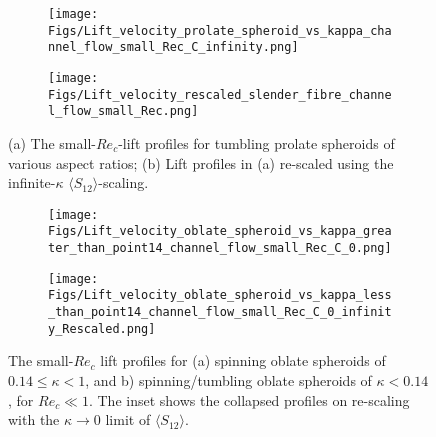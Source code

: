 \documentclass{jfm}
\begin{document}
\begin{figure}
	\centering
    \begin{subfigure}[b]{0.49\textwidth}
		\texttt{[image: Figs/Lift\_velocity\_prolate\_spheroid\_vs\_kappa\_channel\_flow\_small\_Rec\_C\_infinity.png]}
        \caption{}
    \end{subfigure}
    \hfill
    \begin{subfigure}[b]{0.49\textwidth}
		\texttt{[image: Figs/Lift\_velocity\_rescaled\_slender\_fibre\_channel\_flow\_small\_Rec.png]}
        \caption{}
    \end{subfigure}
	\caption{(a) The small-$Re_c$-lift profiles for tumbling prolate spheroids of various aspect ratios; (b) Lift profiles in (a) re-scaled using the infinite-$\kappa$ $\langle S_{12}\rangle$-scaling.}
	\label{fig:Ch3VpTumblingvskappa}
\end{figure}

\begin{figure}
	\centering
    \begin{subfigure}[b]{0.49\textwidth}
		\texttt{[image: Figs/Lift\_velocity\_oblate\_spheroid\_vs\_kappa\_greater\_than\_point14\_channel\_flow\_small\_Rec\_C\_0.png]}
        \caption{}
    \end{subfigure}
    \hfill
    \begin{subfigure}[b]{0.49\textwidth}
		\texttt{[image: Figs/Lift\_velocity\_oblate\_spheroid\_vs\_kappa\_less\_than\_point14\_channel\_flow\_small\_Rec\_C\_0\_infinity\_Rescaled.png]}
        \caption{}
    \end{subfigure}
	\caption{The small-$Re_c$ lift profiles for (a) spinning oblate spheroids of $0.14\leq\kappa<1$, and b) spinning/tumbling oblate spheroids of $\kappa<0.14$, for $Re_c\ll1$. The inset shows the collapsed profiles on re-scaling with the $\kappa\to0$ limit of $\langle S_{12}\rangle$.}
	\label{fig:Ch3VpOblatevskappa}
\end{figure}
\end{document}
